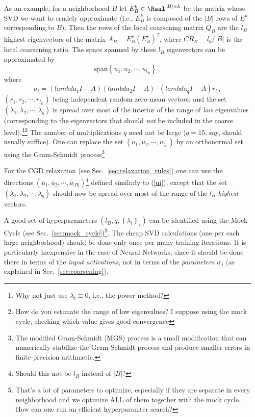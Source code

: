 \documentclass{article} %
\begin{document}
As an example, for a neighborhood $B$ let $E^k_B \in \Real^{|B| \times k}$ be the matrix whose SVD we want to crudely approximate (i.e., $E^k_B$ is composed of the $|B|$ rows of $E^k$ corresponding to $B$). Then the rows of the local coarsening matrix $Q_B$ are the $l_B$ highest eigenvectors of the matrix $A_B = E^k_B (E^k_B)^T$, where $CR_B = l_b/|B|$ is the local coarsening ratio. The space spanned by these $l_B$ eigenvectors can be approximated by
$$ \text{span}\left\{u_1, u_2, \cdots, u_{l_B} \right\}\,,$$
where
\begin{equation}
    u_i = \left(lambda_1 I - A\right) \left(lambda_2 I - A\right) \cdot \left(lambda_q I - A\right) r_i\,,
    \label{ui}
\end{equation}
$(r_1, r_2, \cdots, r_{l_B})$ being independent random zero-mean vectors, and the set $(\lambda_1, \lambda_2, \cdots, \lambda_q)$ is spread over most of the interior of the range of {\it low} eigenvalues (corresponding to the eigenvectors that should {\it not} be included in the coarse level).\footnote{Why not just use $\lambda_i \equiv 0$, i.e., the power method?}\footnote{How do you estimate the range of low eigenvalues? I suppose using the mock cycle, checking which value gives good convergence} The number of multiplications $q$ need not be large ($q = 15$, say, should usually suffice). One can replace the set $(u_1, u_2, \cdots, u_{l_B})$ by an orthonormal set using the Gram-Schmidt process\footnote{The modified Gram-Schmidt (MGS) process is a small modification that can numerically stabilize the Gram-Schmidt process and produce smaller errors in finite-precision arithmetic.}

For the CGD relaxation (see Sec.~\ref{sec:relaxation_rules}) one can use the directions $(\bar{u}_1, \bar{u}_2, \cdots, \bar{u}_{|B|})$\footnote{Should this not be $l_B$ instead of $|B|$?} defined similarly to (\ref{ui}), except that the set $(\lambda_1, \lambda_2, \cdots, \lambda_q)$ should now be spread over most of the range of the $l_B$ {\it highest} vectors.

A good set of hyperparameters $(l_B, q, \left\{\lambda_i\right\}_i)$ can be identified using the Mock Cycle (see Sec.~\ref{sec:mock_cycle})\footnote{That's a lot of parameters to optimize, especially if they are separate in every neighborhood and we optimize ALL of them together with the mock cycle. How can one run an efficient hyperparamter search?}. The cheap SVD calculations (one per each large neighborhood) should be done only once per many training iterations. It is particularly inexpensive in the case of Neural Networks, since it should be done there in terms of the {\it input activations}, not in terms of the {\it parameters} $w_i$ (as explained in Sec.~\ref{sec:coarsening}).
\end{document}
